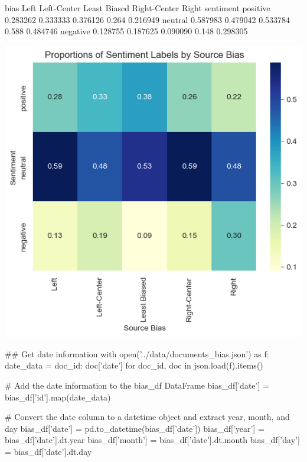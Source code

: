 \begin{pyprint}
bias           Left  Left-Center  Least Biased  Right-Center     Right
sentiment                                                             
positive   0.283262     0.333333      0.376126         0.264  0.216949
neutral    0.587983     0.479042      0.533784         0.588  0.484746
negative   0.128755     0.187625      0.090090         0.148  0.298305
\end{pyprint}

\includegraphics[width=\textwidth]{./figs/fig_3.png}

\begin{pyin}
\## Get date information
with open('../data/documents_bias.json') as f:
    date_data = {doc_id: doc['date'] for doc_id, doc in json.load(f).items()}

# Add the date information to the bias_df DataFrame
bias_df['date'] = bias_df['id'].map(date_data)

# Convert the date column to a datetime object and extract year, month, and day
bias_df['date'] = pd.to_datetime(bias_df['date'])
bias_df['year'] = bias_df['date'].dt.year
bias_df['month'] = bias_df['date'].dt.month
bias_df['day'] = bias_df['date'].dt.day
\end{pyin}

